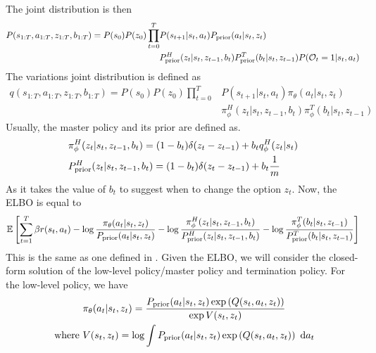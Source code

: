 The joint distribution is then 
\begin{equation}
\begin{aligned}
    P(s_{1:T}, a_{1:T}, z_{1:T}, b_{1:T}) = P(s_0)P(z_0)\prod^T_{t=0} &P(s_{t+1} | s_t, a_t) P_{\text{prior}}(a_t | s_t, z_t)\\
    &P_{\text{prior}}^H(z_t | s_t, z_{t-1}, b_t) P_{\text{prior}}^T(b_t | s_t, z_{t-1}) P(\mathcal{O}_t = 1 | s_t, a_t)
 \end{aligned}
\end{equation}
The variations joint distribution is defined as 
\begin{equation}
\begin{aligned}
    q(s_{1:T}, a_{1:T}, z_{1:T}, b_{1:T}) = P(s_0)P(z_0)\prod^T_{t=0} &P(s_{t+1} | s_t, a_t) \pi_{\theta}(a_t | s_t, z_t)\\
    &\pi^H_{\phi}(z_t | s_t, z_{t-1}, b_t) \pi^T_{\phi}(b_t | s_t, z_{t-1}) 
\end{aligned}
\end{equation}
Usually, the master policy and its prior are defined as. 
\begin{equation}
\begin{aligned}
    &\pi^H_{\phi}(z_t | s_t, z_{t-1}, b_t) = (1-b_t) \delta(z_t  - z_{t-1}) + b_t q^H_{\phi}(z_t | s_t) \\ 
    &P_{\text{prior}}^H(z_t | s_t, z_{t-1}, b_t) = (1-b_t) \delta(z_t  - z_{t-1}) + b_t \frac{1}{m}
\end{aligned}
\end{equation}
As it takes the value of $b_t$ to suggest when to change the option $z_t$. Now, the ELBO is equal to 
\begin{equation}
    \mathbb{E}\left[ \sum^T_{t=1} \beta r(s_t, a_t) - \log \frac{\pi_{\theta}(a_t | s_t, z_t)}{P_{\text{prior}}(a_t | s_t, z_t)}  - \log \frac{\pi^H_{\phi}(z_t | s_t, z_{t-1}, b_t)}{P_{\text{prior}}^H(z_t | s_t, z_{t-1}, b_t)} - \log \frac{\pi^T_{\phi}(b_t | s_t, z_{t-1}) }{P_{\text{prior}}^T(b_t | s_t, z_{t-1})} \right]
\end{equation}
This is the same as one defined in \cite{igl2019multitask}. Given the ELBO, we will consider the closed-form solution of the low-level policy/master policy and termination policy. For the low-level policy, we have 
\begin{equation}
\begin{aligned}
\label{eqn:chap4-single-HRL-lower}
    &\pi_{\theta}(a_{t} | s_{t}, z_{t}) = \frac{P_{\text{prior}}(a_{t} | s_{t}, z_{t})\exp\left( Q(s_{t}, a_{t}, z_{t}) \right)}{\exp V(s_{t}, z_{t})} \\
    \text{ where }&V(s_{t}, z_{t}) = \log \int P_{\text{prior}}(a_{t} | s_{t}, z_{t})\exp\left( Q(s_{t}, a_{t}, z_{t}) \right) \ \mathrm{d} a_{t}
\end{aligned}
\end{equation}
